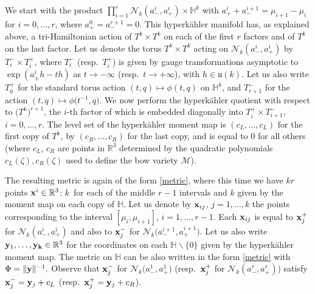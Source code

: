 \documentclass[10pt,a4paper]{amsart}
\renewcommand{\u}{{\mathfrak u}}
\numberwithin{equation}{section}
\newcommand{\oH}{{\mathbb{H}}}
\newcommand{\oR}{{\mathbb{R}}}
\newcommand{\sM}{{\mathcal{M}}} %
\newcommand{\sN}{{\mathcal{N}}}
\begin{document}
{ We start with the product $\prod_{i=1}^r\sN_k(a_-^{i},a_+^i) \times \oH^k$ with $a_+^i+a_-^{i+1}=\mu_{i+1}-\mu_i$ for $i=0,\dots,r$, where $a_+^0=a_-^{r+1}=0$. This hyperk\"ahler manifold has, as explained above, a tri-Hamiltonian action of $T^k\times T^k$ on each of the first $r$ factors and of $T^k$ on the last factor. Let us denote the torus $T^k\times T^k$ acting on $\sN_k(a_-^{i},a_+^i)$ by $T_i^-\times T_i^+$, where $T_i^-$ (resp.~$T_i^+$) is given by gauge transformations
 asymptotic to $\exp(a^i_\pm h-th)$ as $t\to -\infty$ (resp.~$t\to +\infty$), with $h\in \u(k)$. Let us also write $T^+_0$ for the standard torus action $(t,q)\mapsto\phi(t,q)$ on $\oH^k$, and $T^-_{r+1}$ for the action $(t,q)\mapsto \phi\big(t^{-1},q\big)$. We now perform the hyperk\"ahler quotient with respect to $\big(T^k\big)^{r+1}$, the $i$-th factor of which is embedded diagonally into $T_i^+\times T_{i+1}^-$,
 $i=0,\dots,r$. The level set of the hyperk\"ahler moment map is $(c_L,\dots,c_L)$ for the first copy of $T^k$, by $(c_R,\dots,c_R)$ for the last copy, and is equal to $0$ for all others (where $c_L$, $c_R$ are points in $\oR^3$ determined by the quadratic polynomials $c_L(\zeta),c_R(\zeta)$ used to define the bow variety $\sM$).

 The resulting metric is again of the form \eqref{metric}, where this time we have $kr$ points ${\bf x}^i\in \oR^3$: $k$~for each of the middle $r-1$ intervals and $k$ given by the moment map on each copy of $\oH$. Let us denote by ${\bf x}_{ij}$, $j=1,\dots,k$ the points corresponding to the interval
 $[\mu_i,\mu_{i+1}]$, $i=1,\dots,r-1$. Each ${\bf x}_{ij}$ is equal to ${\bf x}_j^+$ for $\sN_k(a_-^{i},a_+^i)$ and also to ${\bf x}_j^-$ for $\sN_k\big(a_-^{i+1},a_+^{i+1}\big)$. Let us also write ${\bf y}_1,\dots,{\bf y_k}\in\oR^3$ for the coordinates on each $\oH\backslash\{0\}$ given by the hyperk\"ahler moment map. The metric on $\oH$ can be also written in the form \eqref{metric} with $\Phi=\|{\bf y}\|^{-1}.$ Observe that ${\bf x}_j^-$ for $\sN_k\big(a_-^{1},a_+^1\big)$ (resp.~${\bf x}_j^+$ for $\sN_k(a_-^{r},a_+^r)$) satisfy ${\bf x}_j^-={\bf y}_j+c_L$ (resp.~${\bf x}_j^+={\bf y}_j+c_R$).

}
\end{document}

